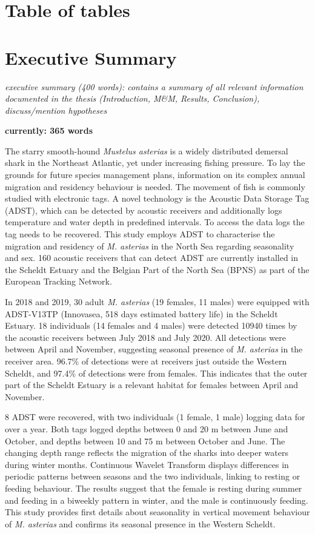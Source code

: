 \documentclass[
  authoryear,
  review,
  3p]{elsarticle}
\begin{document}
\hypertarget{table-of-tables}{%
\section{Table of tables}\label{table-of-tables}}

\newpage{}

\hypertarget{executive-summary}{%
\section{Executive Summary}\label{executive-summary}}

\emph{executive summary (400 words): contains a summary of all relevant
information documented in the thesis (Introduction, M\&M, Results,
Conclusion), discuss/mention hypotheses}

\textbf{currently: 365 words}

The starry smooth-hound \emph{Mustelus asterias} is a widely distributed
demersal shark in the Northeast Atlantic, yet under increasing fishing
pressure. To lay the grounds for future species management plans,
information on its complex annual migration and residency behaviour is
needed. The movement of fish is commonly studied with electronic tags. A
novel technology is the Acoustic Data Storage Tag (ADST), which can be
detected by acoustic receivers and additionally logs temperature and
water depth in predefined intervals. To access the data logs the tag
needs to be recovered. This study employs ADST to characterise the
migration and residency of \emph{M. asterias} in the North Sea regarding
seasonality and sex. 160 acoustic receivers that can detect ADST are
currently installed in the Scheldt Estuary and the Belgian Part of the
North Sea (BPNS) as part of the European Tracking Network.

In 2018 and 2019, 30 adult \emph{M. asterias} (19 females, 11 males)
were equipped with ADST-V13TP (Innovasea, 518 days estimated battery
life) in the Scheldt Estuary. 18 individuals (14 females and 4 males)
were detected 10940 times by the acoustic receivers between July 2018
and July 2020. All detections were between April and November,
suggesting seasonal presence of \emph{M. asterias} in the receiver area.
96.7\% of detections were at receivers just outside the Western Scheldt,
and 97.4\% of detections were from females. This indicates that the
outer part of the Scheldt Estuary is a relevant habitat for females
between April and November.

8 ADST were recovered, with two individuals (1 female, 1 male) logging
data for over a year. Both tags logged depths between 0 and 20 m between
June and October, and depths between 10 and 75 m between October and
June. The changing depth range reflects the migration of the sharks into
deeper waters during winter months. Continuous Wavelet Transform
displays differences in periodic patterns between seasons and the two
individuals, linking to resting or feeding behaviour. The results
suggest that the female is resting during summer and feeding in a
biweekly pattern in winter, and the male is continuously feeding. This
study provides first details about seasonality in vertical movement
behaviour of \emph{M. asterias} and confirms its seasonal presence in
the Western Scheldt.
\end{document}

